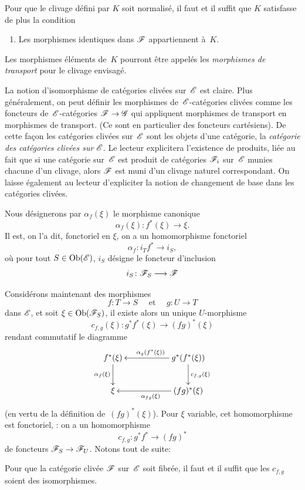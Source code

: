 Pour que le clivage d\'efini par $K$ soit normalis\'e, il faut et
il suffit que $K$ satisfasse de plus la condition
\begin{enumerate}
\item[c)] Les morphismes identiques dans $\cal{F}$ appartiennent
\`a~$K$.
\end{enumerate}

Les
morphismes \'el\'ements de~$K$ pourront \^etre appel\'es les
\emph{\og morphismes de transport\fg}
pour le clivage envisag\'e.

La notion d'isomorphisme de cat\'egories cliv\'ees sur~$\cal{E}$
est claire. Plus g\'en\'eralement, on peut d\'efinir les
morphismes de~$\cal{E}$-cat\'egories cliv\'ees comme les foncteurs
de~$\cal{E}$-cat\'egories $\cal{F}\to \cal{G}$ qui appliquent
morphismes de transport en morphismes de transport. (Ce sont en
particulier des foncteurs cart\'esiens). De cette fa\c con les
cat\'egories cliv\'ees sur~$\cal{E}$ sont les objets d'une
cat\'egorie, la \emph{catégorie des catégories clivées
sur} $\cal{E}$. Le lecteur explicitera l'existence de produits,
li\'ee au fait que si une cat\'egorie sur~$\cal{E}$ est produit de
cat\'egories $\cal{F}_i$ sur~$\cal{E}$ munies chacune d'un clivage,
alors $\cal{F}$ est muni d'un clivage naturel correspondant. On laisse
\'egalement au lecteur d'expliciter la notion de changement de base
dans les cat\'egories cliv\'ees.

Nous d\'esignerons par $\alpha_f(\xi)$ le morphisme canonique
$$
\alpha_f(\xi)\colon f^*(\xi)\to\xi.
$$
Il est, on l'a dit, fonctoriel en $\xi$, \ie on a un homomorphisme
fonctoriel
$$
\alpha_f\colon i_Tf^*\to i_S,
$$
o\`u pour tout $S\in\Ob(\cal{E})$, $i_S$ d\'esigne le foncteur
d'inclusion
$$
i_S\colon\cal{F}_S\to \cal{F}
$$

Consid\'erons maintenant des morphismes
$$
f\colon T\to S\quad\text{ et }\quad g\colon U\to T
$$
dans $\cal{E}$, et soit $\xi\in\Ob(\cal{F}_S)$, il existe alors un
unique $U$-morphisme
$$
c_{f,g}(\xi)\colon g^*f^*(\xi)\to (fg)^*(\xi)
$$
rendant
commutatif le diagramme
$$
\xymatrix{{f^*(\xi)}\ar[d]_{\alpha_f(\xi)}& &{g^*(f^*(\xi))}\ar[ll]_{\alpha_g(f^*(\xi))}\ar[d]^{c_{f,g}(\xi)}\\{\xi}& &{(fg)^*(\xi)}\ar[ll]^{\alpha_{fg}(\xi)}}
$$
(en vertu de la d\'efinition de~$(fg)^*(\xi)$). Pour $\xi$ variable,
cet homomorphisme est fonctoriel, \ie : on a un homomorphisme
$$
c_{f,g}\colon g^*f^*\to (fg)^*
$$
de foncteurs $\cal{F}_S\to\cal{F}_U$. Notons tout de suite:
\begin{proposition}
\label{VI.7.2} Pour que la cat\'egorie cliv\'ee $\cal{F}$
sur~$\cal{E}$ soit fibr\'ee, il faut et il suffit que les $c_{f,g}$
soient des isomorphismes.
\end{proposition}

